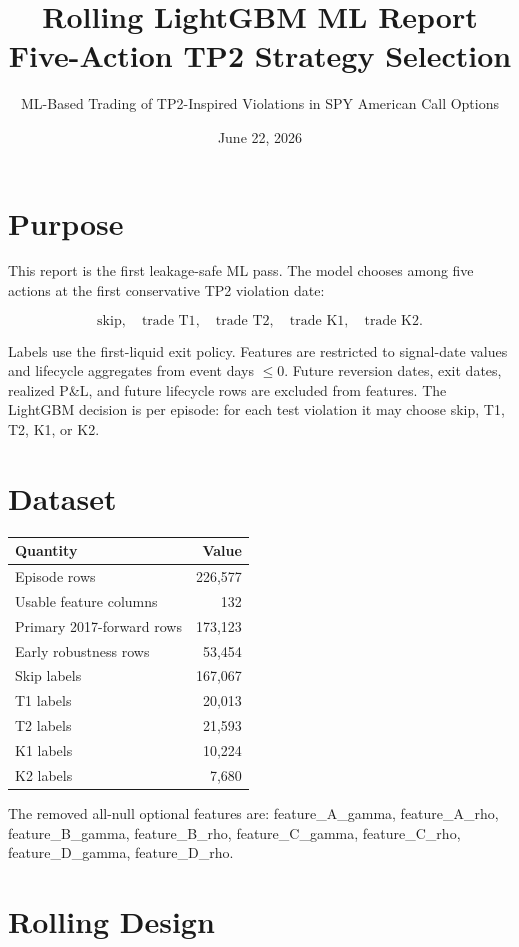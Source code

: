 \documentclass[11pt]{article}
\title{Rolling LightGBM ML Report\\\large Five-Action TP2 Strategy Selection}
\author{ML-Based Trading of TP2-Inspired Violations in SPY American Call Options}
\date{June 22, 2026}
\begin{document}
\maketitle

\section{Purpose}

This report is the first leakage-safe ML pass. The model chooses among five actions at the first
conservative TP2 violation date:

\[
\text{skip},\quad \text{trade T1},\quad \text{trade T2},\quad \text{trade K1},\quad \text{trade K2}.
\]

Labels use the first-liquid exit policy. Features are restricted to signal-date values and
lifecycle aggregates from event days \(\le 0\). Future reversion dates, exit dates, realized
P\&L, and future lifecycle rows are excluded from features. The LightGBM decision is per episode:
for each test violation it may choose skip, T1, T2, K1, or K2.

\section{Dataset}

\begin{center}
\begin{tabular}{lr}
\toprule
Quantity & Value \\
\midrule
Episode rows & 226,577 \\
Usable feature columns & 132 \\
Primary 2017-forward rows & 173,123 \\
Early robustness rows & 53,454 \\
Skip labels & 167,067 \\
T1 labels & 20,013 \\
T2 labels & 21,593 \\
K1 labels & 10,224 \\
K2 labels & 7,680 \\
\bottomrule
\end{tabular}
\end{center}

The removed all-null optional features are:
feature\_A\_gamma, feature\_A\_rho, feature\_B\_gamma, feature\_B\_rho, feature\_C\_gamma, feature\_C\_rho, feature\_D\_gamma, feature\_D\_rho.

\section{Rolling Design}
\end{document}
